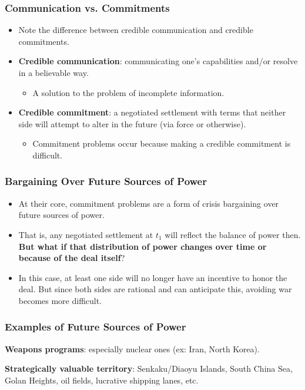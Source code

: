 \documentclass[handout]{beamer}
\begin{document}
\begin{frame} 
	\frametitle{\LARGE{Communication vs. Commitments}}
	\begin{itemize}
		\item Note the difference between credible communication and credible commitments. \pause
		\item \textbf{Credible communication}: communicating one's capabilities and/or resolve in a believable way.  
		\begin{itemize}
			\item A solution to the problem of incomplete information. \pause
		\end{itemize}
		\item \textbf{Credible commitment}: a negotiated settlement with terms that neither side will attempt to alter in the future (via force or otherwise). \pause
		\begin{itemize}
			\item Commitment problems occur because making a credible commitment is difficult.
		\end{itemize}
	\end{itemize}
\end{frame}

\begin{frame} 
	\frametitle{\LARGE{Bargaining Over Future Sources of Power}}
	\begin{itemize}
		\item At their core, commitment problems are a form of crisis bargaining over future sources of power. \pause
		\item That is, any negotiated settlement at $t_1$ will reflect the balance of power then. \textbf{But what if that distribution of power changes over time or because of the deal itself}? \pause
		\item In this case, at least one side will no longer have an incentive to honor the deal. But since both sides are rational and can anticipate this, avoiding war becomes more difficult.	
	\end{itemize}
\end{frame}

\begin{frame} 
	\frametitle{\LARGE{Examples of Future Sources of Power}}
	\begin{itemize}
		\Large{
			\item \textbf{Weapons programs}: especially nuclear ones (ex: Iran, North Korea).
			\item\textbf{Strategically valuable territory}: Senkaku/Diaoyu Islands, South China Sea, Golan Heights, oil fields, lucrative shipping lanes, etc.
		}
	\end{itemize}
\end{frame}
\end{document}
